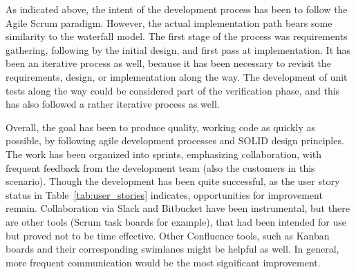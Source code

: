 As indicated above, the intent of the development process has been to follow the Agile Scrum paradigm.
However, the actual implementation path bears some similarity to the waterfall model. The first
stage of the process was requirements gathering, following by the initial design, and first pass at
implementation. It has been an iterative process as well, because it has been necessary to revisit
the requirements, design, or implementation along the way. The development of unit tests along the
way could be considered part of the verification phase, and this has also followed a rather
iterative process as well.

Overall, the goal has been to produce quality, working code as quickly as possible, by following
agile development processes and SOLID design principles. The work has been organized into sprints,
emphasizing collaboration, with frequent feedback from the development team (also the customers
in this scenario). Though the development has been quite successful, as the user story status in
Table~\ref{tab:user_stories} indicates, opportunities for improvement remain. Collaboration via
Slack and Bitbucket have been instrumental, but there are other tools (Scrum task boards for example),
that had been intended for use but proved not to be time effective. Other Confluence tools, such as
Kanban boards and their corresponding swimlanes might be helpful as well. In general, more
frequent communication would be the most significant improvement.


